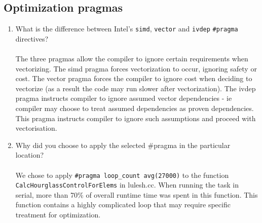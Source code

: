 \documentclass{article}
\begin{document}
\subsection{Optimization pragmas}
\begin{enumerate}
\item{What is the difference between Intel's \verb!simd!, \verb!vector! and \verb!ivdep! \verb!#pragma! directives?}\\\\
The three pragmas allow the compiler to ignore certain requirements when vectorizing. The simd pragma forces vectorization to occur, ignoring safety or cost. The vector pragma forces the compiler to ignore cost when deciding to vectorize (as a result the code may run slower after vectorization). The ivdep pragma instructs compiler to ignore assumed vector dependencies - ie compiler may choose to treat assumed dependencies as proven dependencies. This pragma instructs compiler to ignore such assumptions and proceed with vectorisation.
\item{Why did you choose to apply the selected \#pragma in the particular location?}\\\\
We chose to apply \verb!#pragma loop_count avg(27000)! to the function \verb!CalcHourglassControlForElems! in lulesh.cc. When running the task in serial, more than 70\% of overall runtime time was spent in this function. This function contains a highly complicated loop that may require specific treatment for optimization.
\end{enumerate}
\end{document}
